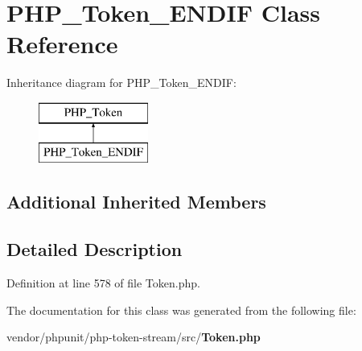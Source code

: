 \section{P\+H\+P\+\_\+\+Token\+\_\+\+E\+N\+D\+I\+F Class Reference}
\label{class_p_h_p___token___e_n_d_i_f}
Inheritance diagram for P\+H\+P\+\_\+\+Token\+\_\+\+E\+N\+D\+I\+F\+:\begin{figure}[H]
\begin{center}
\leavevmode
\includegraphics[height=2.000000cm]{class_p_h_p___token___e_n_d_i_f}
\end{center}
\end{figure}
\subsection*{Additional Inherited Members}


\subsection{Detailed Description}


Definition at line 578 of file Token.\+php.



The documentation for this class was generated from the following file\+:\begin{DoxyCompactItemize}
\item 
vendor/phpunit/php-\/token-\/stream/src/{\bf Token.\+php}\end{DoxyCompactItemize}
